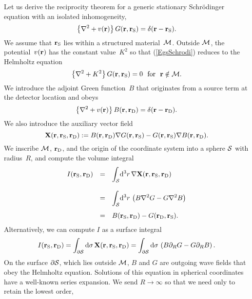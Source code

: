 Let us derive the reciprocity theorem
for a generic stationary Schrödinger equation
with an isolated inhomogeneity,
\begin{equation}\label{EgsSchrodi}
  \left\{\mathbf{\nabla}^2+v(\mathbf{r})\right\}G(\mathbf{r},\mathbf{r}_\text{S}) = \delta(\mathbf{r}-\mathbf{r}_\text{S}).
\end{equation}
We assume that $\mathbf{r}_\text{S}$ lies within a structured material~$\mathcal{M}$.
Outside $\mathcal{M}$,
the potential~$v(\mathbf{r})$ has the constant value~$K^2$
so that (\ref{EgsSchrodi})
reduces to the Helmholtz equation
\begin{equation}\label{EgsSchrodiHelmh}
  \left\{\mathbf{\nabla}^2+K^2\right\}G(\mathbf{r},\mathbf{r}_\text{S}) = 0
  \text{~~for~~}\mathbf{r}\notin\mathcal{M}.
\end{equation}
We introduce the adjoint Green function~$B$
that originates from a source term at the detector location
and obeys
\begin{equation}\label{EgsSchrodiAdj}
  \left\{\mathbf{\nabla}^2+v(\mathbf{r})\right\}B(\mathbf{r},\mathbf{r}_\text{D}) = \delta(\mathbf{r}-\mathbf{r}_\text{D}).
\end{equation}
We also introduce the auxiliary vector field
\begin{equation}
  \mathbf{X}(\mathbf{r},\mathbf{r}_\text{S},\mathbf{r}_\text{D}):=B(\mathbf{r},\mathbf{r}_\text{D})\mathbf{\nabla} G(\mathbf{r},\mathbf{r}_\text{S}) - G(\mathbf{r},\mathbf{r}_\text{S})\mathbf{\nabla} B(\mathbf{r},\mathbf{r}_\text{D}).
\end{equation}
We inscribe $\mathcal{M}$, $\mathbf{r}_\text{D}$, and the origin of the coordinate system
into a sphere $\mathcal{S}$ with radius~$R$,
and compute the volume integral
\begin{equation}\label{Eprerecipro}
  \begin{array}{lcl}
    I(\mathbf{r}_\text{S},\mathbf{r}_\text{D})
  &=& \displaystyle\int_{\mathcal{S}}\!{\rm d}^3r\,\mathbf{\nabla} \mathbf{X}(\mathbf{r},\mathbf{r}_\text{S},\mathbf{r}_\text{D})
  \\[1.8em]
  &=& \displaystyle\int_{\mathcal{S}}\!{\rm d}^3r\,\left(
    B\mathbf{\nabla}^2 G- G\mathbf{\nabla}^2 B \right)
  \\[1.4em]
  &=&  B(\mathbf{r}_\text{S},\mathbf{r}_\text{D}) - G(\mathbf{r}_\text{D},\mathbf{r}_\text{S}).
  \end{array}
\end{equation}
Alternatively, we can compute $I$ as a surface integral
\begin{equation}
  I(\mathbf{r}_\text{S},\mathbf{r}_\text{D})
  =\displaystyle\int_{\partial\mathcal{S}}{\rm d}\mathbf{\sigma}\,\mathbf{X}(\mathbf{r},\mathbf{r}_\text{S},\mathbf{r}_\text{D})
  =\displaystyle\int_{\partial\mathcal{S}}{\rm d}{\sigma}\,
       \left(B\partial_R G - G\partial_R B\right).
\end{equation}
On the surface $\partial\mathcal{S}$, which lies outside $\mathcal{M}$,
$B$ and $G$ are outgoing wave fields that obey the Helmholtz equation.
Solutions of this equation in spherical coordinates
have a well-known series expansion.
We send $R\to\infty$ so that we need only to retain the lowest order,
